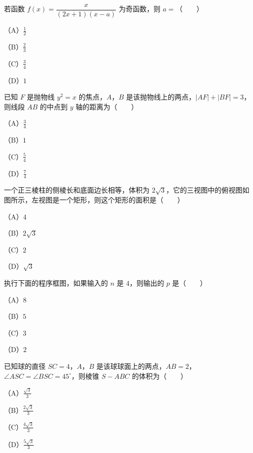 \begin{question}
若函数 $f(x)=\dfrac{x}{(2x+1)(x-a)}$ 为奇函数，则 $a=$\mbox{（　　）}

（A）$\frac12$

（B）$\frac23$

（C）$\frac34$

（D）$1$

\end{question}
\begin{question}
已知 $F$ 是抛物线 $y^2=x$ 的焦点，$A$，$B$ 是该抛物线上的两点，$|AF|+|BF|=3$，则线段 $AB$ 的中点到 $y$ 轴的距离为\mbox{（　　）}

（A）$\frac34$

（B）$1$

（C）$\frac54$

（D）$\frac74$

\Needspace{0.4\textheight}
\end{question}
\begin{question}
一个正三棱柱的侧棱长和底面边长相等，体积为 $2\sqrt3$，它的三视图中的俯视图如图所示，左视图是一个矩形，则这个矩形的面积是\mbox{（　　）}

（A）$4$

（B）$2\sqrt3$

（C）$2$

（D）$\sqrt3$
\nopagebreak[4]
\begin{center}\end{center}
\nopagebreak[4]
\Needspace{0.4\textheight}
\end{question}
\begin{question}
执行下面的程序框图，如果输入的 $n$ 是 $4$，则输出的 $p$ 是\mbox{（　　）}

（A）$8$

（B）$5$

（C）$3$

（D）$2$
\nopagebreak[4]
\begin{center}\end{center}
\nopagebreak[4]
\end{question}
\begin{question}
已知球的直径 $SC=4$，$A$，$B$ 是该球球面上的两点，$AB=2$，$\angle ASC=\angle BSC=45^\circ$，则棱锥 $S-ABC$ 的体积为\mbox{（　　）}

（A）$\frac{\sqrt3}3$

（B）$\frac{2\sqrt3}3$

（C）$\frac{4\sqrt3}3$

（D）$\frac{5\sqrt3}3$

\end{question}
